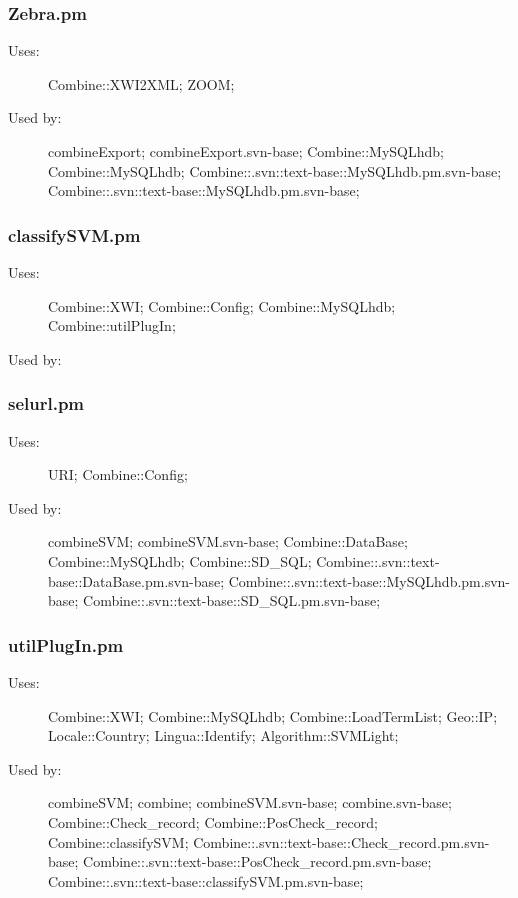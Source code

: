 \subsubsection{Zebra.pm}
\begin{description}
\item[Uses:] Combine::XWI2XML; ZOOM; 

\item[Used by:] combineExport; combineExport.svn-base; Combine::MySQLhdb; Combine::MySQLhdb; Combine::.svn::text-base::MySQLhdb.pm.svn-base; Combine::.svn::text-base::MySQLhdb.pm.svn-base; 

\end{description}
\subsubsection{classifySVM.pm}
\begin{description}
\item[Uses:] Combine::XWI; Combine::Config; Combine::MySQLhdb; Combine::utilPlugIn; 

\item[Used by:] 

\end{description}
\subsubsection{selurl.pm}
\begin{description}
\item[Uses:] URI; Combine::Config; 

\item[Used by:] combineSVM; combineSVM.svn-base; Combine::DataBase; Combine::MySQLhdb; Combine::SD\_SQL; Combine::.svn::text-base::DataBase.pm.svn-base; Combine::.svn::text-base::MySQLhdb.pm.svn-base; Combine::.svn::text-base::SD\_SQL.pm.svn-base; 

\end{description}
\subsubsection{utilPlugIn.pm}
\begin{description}
\item[Uses:] Combine::XWI; Combine::MySQLhdb; Combine::LoadTermList; Geo::IP; Locale::Country; Lingua::Identify; Algorithm::SVMLight; 

\item[Used by:] combineSVM; combine; combineSVM.svn-base; combine.svn-base; Combine::Check\_record; Combine::PosCheck\_record; Combine::classifySVM; Combine::.svn::text-base::Check\_record.pm.svn-base; Combine::.svn::text-base::PosCheck\_record.pm.svn-base; Combine::.svn::text-base::classifySVM.pm.svn-base; 

\end{description}
